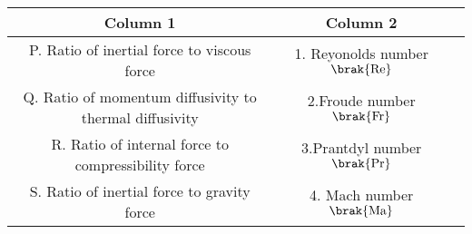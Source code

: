 \begin{tabular}[10pt]{ |c| c| c|}
    \hline
    \textbf{Column 1} & \textbf{Column 2}\\ 
    \hline
     P. Ratio of inertial force to viscous force&1. Reyonolds number$\brak{\text{Re}}$\\
    \hline 
    Q. Ratio of momentum diffusivity to thermal diffusivity&2.Froude number$\brak{\text{Fr}}$\\
    \hline 
    R. Ratio of internal force to compressibility force&3.Prantdyl number$\brak{\text{Pr}}$\\
    \hline
    S. Ratio of inertial force to gravity force&4. Mach number$\brak{\text{Ma}}$\\
    \hline
    \end{tabular}
